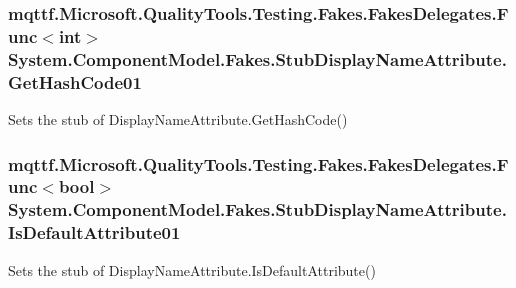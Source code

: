 \hypertarget{class_system_1_1_component_model_1_1_fakes_1_1_stub_display_name_attribute_ac18573275a8b5750a08eaa64dc6b4a12}{
\subsubsection[{Get\-Hash\-Code01}]{\setlength{\rightskip}{0pt plus 5cm}mqttf.\-Microsoft.\-Quality\-Tools.\-Testing.\-Fakes.\-Fakes\-Delegates.\-Func$<$int$>$ System.\-Component\-Model.\-Fakes.\-Stub\-Display\-Name\-Attribute.\-Get\-Hash\-Code01}}\label{class_system_1_1_component_model_1_1_fakes_1_1_stub_display_name_attribute_ac18573275a8b5750a08eaa64dc6b4a12}


Sets the stub of Display\-Name\-Attribute.\-Get\-Hash\-Code()

\hypertarget{class_system_1_1_component_model_1_1_fakes_1_1_stub_display_name_attribute_a8dcc6bfd3d0b520f2684e65504867da5}{
\subsubsection[{Is\-Default\-Attribute01}]{\setlength{\rightskip}{0pt plus 5cm}mqttf.\-Microsoft.\-Quality\-Tools.\-Testing.\-Fakes.\-Fakes\-Delegates.\-Func$<$bool$>$ System.\-Component\-Model.\-Fakes.\-Stub\-Display\-Name\-Attribute.\-Is\-Default\-Attribute01}}\label{class_system_1_1_component_model_1_1_fakes_1_1_stub_display_name_attribute_a8dcc6bfd3d0b520f2684e65504867da5}


Sets the stub of Display\-Name\-Attribute.\-Is\-Default\-Attribute()

